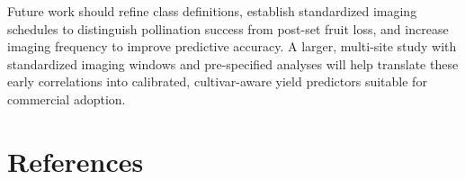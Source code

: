 Future work should refine class definitions, establish standardized imaging schedules to distinguish pollination success from post-set fruit loss, and increase imaging frequency to improve predictive accuracy. A larger, multi-site study with standardized imaging windows and pre-specified analyses will help translate these early correlations into calibrated, cultivar-aware yield predictors suitable for commercial adoption.

\section{References}

\printbibliography[heading=none]
